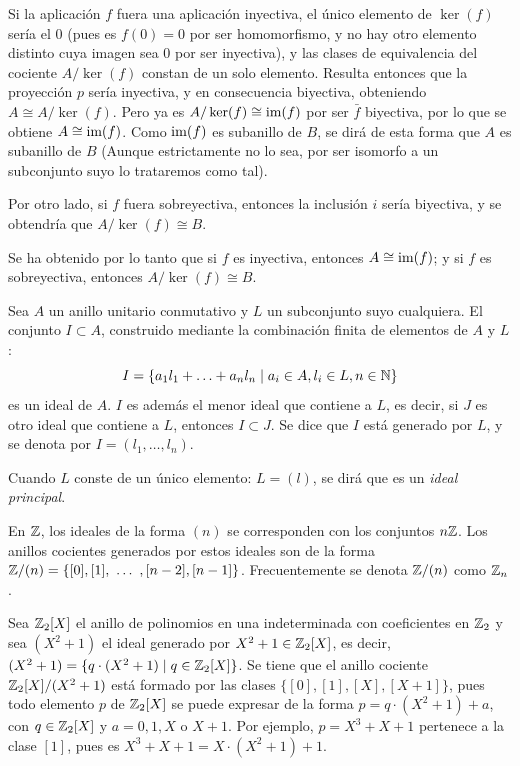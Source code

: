 \begin{obss}
    \item Si la aplicación $f$ fuera una aplicación inyectiva, el único elemento de $\ker (f)$ sería el $0$ (pues es $f(0) = 0$ por ser homomorfismo, y no hay otro elemento distinto cuya imagen sea $0$ por ser inyectiva), y las clases de equivalencia del cociente $A/\ker(f)$ constan de un solo elemento. Resulta entonces que la proyección $p$ sería inyectiva, y en consecuencia biyectiva, obteniendo $A\cong A/\ker(f)$. Pero ya es $A/\ker(f) \cong \text{im}(f)$ por ser $\bar f$ biyectiva, por lo que se obtiene $A\cong \text{im}(f)$. Como $\text{im}(f)$ es subanillo de $B$, se dirá de esta forma que $A$ es subanillo de $B$ (Aunque estrictamente no lo sea, por ser isomorfo a un subconjunto suyo lo trataremos como tal). 
    \item Por otro lado, si $f$ fuera sobreyectiva, entonces la inclusión $i$ sería biyectiva, y se obtendría que $A/\ker (f) \cong B$. 
     
    Se ha obtenido por lo tanto que si $f$ es inyectiva, entonces $A\cong \text{im}(f)$; y si $f$ es sobreyectiva, entonces $A/\ker (f) \cong B$.
    
\end{obss}

\begin{deff}{\cite[p.~27]{GamboaAnillos}}
    Sea $A$ un anillo unitario conmutativo y $L$ un subconjunto suyo cualquiera. El conjunto $I \subset A$, construido mediante la combinación finita de elementos de $A$ y $L$: 
    \[
        I = \{a_1l_1 + \ldots + a_nl_n\mid a_i\in A, l_i \in L, n\in\mathbb{N}\}
    \]
    es un ideal de $A$. $I$ es además el menor ideal que contiene a $L$, es decir, si $J$ es otro ideal que contiene a $L$, entonces $I \subset J$. Se dice que $I$ está generado por $L$, y se denota por $ I = (l_1, \ldots, l_n)$.
    \item Cuando $L$ conste de un único elemento: $L =(l)$, se dirá que es un \textit{ideal principal}.
\end{deff}

\begin{ejs}\label{ej:idealGenerado}
    \item En $\mathbb{Z}$, los ideales de la forma $(n)$ se corresponden con los conjuntos $n\mathbb{Z}$. Los anillos cocientes generados por estos ideales son de la forma $\mathbb{Z}/(n) = \{[0],[1], \ \ldots \ , [n-2], [n-1]\}$. Frecuentemente se denota $\mathbb{Z}/(n)$ como $\mathbb{Z}_n$.
    
    \item 
    
        Sea $\mathbb{Z}_2[X]$ el anillo de polinomios en una indeterminada con coeficientes en $\mathbb{Z}_2$ y sea $(X^2+1)$ el ideal generado por $X^2+1\in \mathbb{Z}_2[X]$, es decir, $(X^2+1) = \{q\cdot(X^2+1) \mid q\in \mathbb{Z}_2[X]\}$. Se tiene que el anillo cociente $\mathbb{Z}_2[X]/(X^2+1)$ está formado por las clases $\{[0],[1],[X],[X+1]\}$, pues todo elemento $p$ de $\mathbb{Z}_2[X]$ se puede expresar de la forma $p = q\cdot(X^2+1) + a$, con $q\in \mathbb{Z}_2[X]$ y $a = 0,1,X \text{ o } X+1$. Por ejemplo, $p = X^3 + X + 1$ pertenece a la clase $[1]$, pues es $X^3 + X + 1 = X\cdot (X^2+1) + 1$.
    
\end{ejs}


